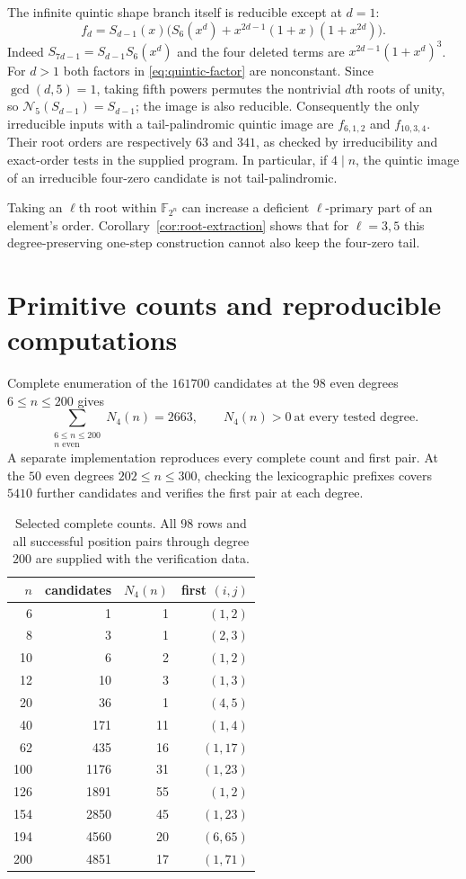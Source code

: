 \documentclass[11pt]{article}
\theoremstyle{definition}
\theoremstyle{remark}
\begin{document}
The infinite quintic shape branch itself is reducible except at $d=1$:
\begin{equation}\label{eq:quintic-factor}
 f_d=S_{d-1}(x)
       \bigl(S_6(x^d)+x^{2d-1}(1+x)(1+x^{2d})\bigr).
\end{equation}
Indeed $S_{7d-1}=S_{d-1}S_6(x^d)$ and the four deleted terms are
$x^{2d-1}(1+x^d)^3$.
For $d>1$ both factors in \eqref{eq:quintic-factor} are nonconstant.
Since $\gcd(d,5)=1$, taking fifth powers permutes the nontrivial
$d$th roots of unity, so
$\mathcal N_5(S_{d-1})=S_{d-1}$; the image is also reducible.
Consequently the only irreducible inputs with a tail-palindromic
quintic image are $f_{6,1,2}$ and $f_{10,3,4}$.
Their root orders are respectively $63$ and $341$, as checked by
irreducibility and exact-order tests in the supplied program.
In particular, if $4\mid n$, the quintic image of an irreducible
four-zero candidate is not tail-palindromic.

Taking an $\ell$th root within $\mathbb F_{2^n}$ can increase a
deficient $\ell$-primary part of an element's order.
Corollary~\ref{cor:root-extraction} shows that for $\ell=3,5$ this
degree-preserving one-step construction cannot also keep the
four-zero tail.


\section{Primitive counts and reproducible computations}\label{sec:computations}
Complete enumeration of the $161700$ candidates at the $98$ even degrees
$6\le n\le200$ gives
\[
 \sum_{\substack{6\le n\le200\\ n\text{ even}}}N_4(n)=2663,
 \qquad N_4(n)>0\ \text{at every tested degree}.
\]
A separate implementation reproduces every complete count and first pair.
At the $50$ even degrees $202\le n\le300$, checking the lexicographic
prefixes covers $5410$ further candidates and verifies the first pair
at each degree.

\begin{table}[ht]
\centering\small
\begin{tabular}{rrrr}
\toprule
$n$ & candidates & $N_4(n)$ & first $(i,j)$\\
\midrule
6 & 1 & 1 & $(1,2)$\\
8 & 3 & 1 & $(2,3)$\\
10 & 6 & 2 & $(1,2)$\\
12 & 10 & 3 & $(1,3)$\\
20 & 36 & 1 & $(4,5)$\\
40 & 171 & 11 & $(1,4)$\\
62 & 435 & 16 & $(1,17)$\\
100 & 1176 & 31 & $(1,23)$\\
126 & 1891 & 55 & $(1,2)$\\
154 & 2850 & 45 & $(1,23)$\\
194 & 4560 & 20 & $(6,65)$\\
200 & 4851 & 17 & $(1,71)$\\
\bottomrule
\end{tabular}
\caption{Selected complete counts. All $98$ rows and all successful
position pairs through degree $200$ are supplied with the verification data.}
\label{tab:counts}
\end{table}
\end{document}
